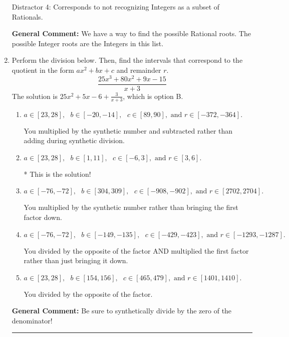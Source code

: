 \documentclass{extbook}[14pt]
\newcommand{\litem}[1]{\item #1

\rule{\textwidth}{0.4pt}}
\begin{document}
\begin{enumerate}
{\begin{enumerate}[label=\Alph*.]
 Distractor 4: Corresponds to not recognizing Integers as a subset of Rationals.
\end{enumerate}

\textbf{General Comment:} We have a way to find the possible Rational roots. The possible Integer roots are the Integers in this list.
}
\litem{
Perform the division below. Then, find the intervals that correspond to the quotient in the form $ax^2+bx+c$ and remainder $r$.
\[ \frac{25x^{3} +80 x^{2} +9 x -15}{x + 3} \]The solution is \( 25x^{2} +5 x -6 + \frac{3}{x + 3} \), which is option B.\begin{enumerate}[label=\Alph*.]
\item \( a \in [23, 28], \text{   } b \in [-20, -14], \text{   } c \in [89, 90], \text{   and   } r \in [-372, -364]. \)

 You multiplied by the synthetic number and subtracted rather than adding during synthetic division.
\item \( a \in [23, 28], \text{   } b \in [1, 11], \text{   } c \in [-6, 3], \text{   and   } r \in [3, 6]. \)

* This is the solution!
\item \( a \in [-76, -72], \text{   } b \in [304, 309], \text{   } c \in [-908, -902], \text{   and   } r \in [2702, 2704]. \)

 You multiplied by the synthetic number rather than bringing the first factor down.
\item \( a \in [-76, -72], \text{   } b \in [-149, -135], \text{   } c \in [-429, -423], \text{   and   } r \in [-1293, -1287]. \)

 You divided by the opposite of the factor AND multiplied the first factor rather than just bringing it down.
\item \( a \in [23, 28], \text{   } b \in [154, 156], \text{   } c \in [465, 479], \text{   and   } r \in [1401, 1410]. \)

 You divided by the opposite of the factor.
\end{enumerate}

\textbf{General Comment:} Be sure to synthetically divide by the zero of the denominator!
}
\end{enumerate}
\end{document}
